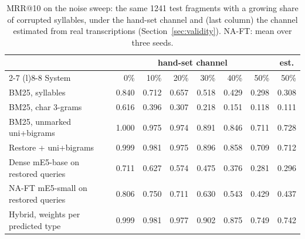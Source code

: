 \begin{table}[t]
\centering
\caption{MRR@10 on the noise sweep: the same 1241 test fragments with a growing share of
corrupted syllables, under the hand-set channel and (last column) the channel estimated from real transcriptions
(Section~\ref{sec:validity}). NA-FT: mean over three seeds.}
\label{tab:noise}
\small
\setlength{\tabcolsep}{4pt}
\begin{tabular}{@{}lrrrrrrr@{}}
\toprule
 & \multicolumn{6}{c}{hand-set channel} & \multicolumn{1}{c}{est.} \\
\cmidrule(lr){2-7} \cmidrule(l){8-8}
System & 0\% & 10\% & 20\% & 30\% & 40\% & 50\% & 50\% \\
\midrule
BM25, syllables & 0.840 & 0.712 & 0.657 & 0.518 & 0.429 & 0.298 & 0.308 \\
BM25, char 3-grams & 0.616 & 0.396 & 0.307 & 0.218 & 0.151 & 0.118 & 0.111 \\
BM25, unmarked uni+bigrams & 1.000 & 0.975 & 0.974 & 0.891 & 0.846 & 0.711 & 0.728 \\
Restore + uni+bigrams & 0.999 & 0.981 & 0.975 & 0.896 & 0.858 & 0.709 & 0.712 \\
Dense mE5-base on restored queries & 0.711 & 0.627 & 0.574 & 0.475 & 0.376 & 0.281 & 0.296 \\
NA-FT mE5-small on restored queries & 0.806 & 0.750 & 0.711 & 0.630 & 0.543 & 0.429 & 0.437 \\
Hybrid, weights per predicted type & 0.999 & 0.981 & 0.977 & 0.902 & 0.875 & 0.749 & 0.742 \\
\bottomrule
\end{tabular}
\end{table}
